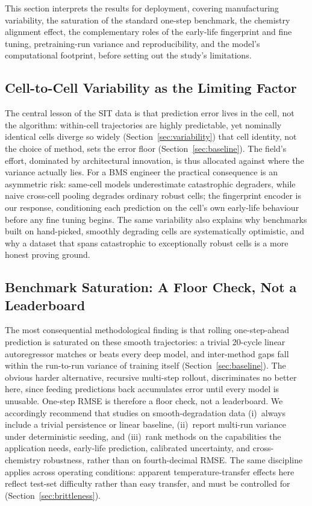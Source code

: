 This section interprets the results for deployment, covering manufacturing
variability, the saturation of the standard one-step benchmark, the chemistry
alignment effect, the complementary roles of the early-life fingerprint and
fine tuning, pretraining-run variance and reproducibility, and the model's
computational footprint, before setting out the study's limitations.

\subsection{Cell-to-Cell Variability as the Limiting Factor}

The central lesson of the SIT data is that prediction error lives in the cell,
not the algorithm: within-cell trajectories are highly predictable, yet
nominally identical cells diverge so widely (Section~\ref{sec:variability}) that
cell identity, not the choice of method, sets the error floor
(Section~\ref{sec:baseline}). The field's effort, dominated by architectural
innovation, is thus allocated against where the variance actually lies. For a
BMS engineer the practical consequence is an asymmetric risk: same-cell models
underestimate catastrophic degraders, while naive cross-cell pooling degrades
ordinary robust cells; the fingerprint encoder is our response, conditioning
each prediction on the cell's own early-life behaviour before any fine tuning
begins. The same variability also explains why benchmarks built on hand-picked,
smoothly degrading cells are systematically optimistic, and why a dataset that
spans catastrophic to exceptionally robust cells is a more honest proving
ground.

\subsection{Benchmark Saturation: A Floor Check, Not a Leaderboard}

The most consequential methodological finding is that rolling one-step-ahead
prediction is saturated on these smooth trajectories: a trivial 20-cycle linear
autoregressor matches or beats every deep model, and inter-method gaps fall
within the run-to-run variance of training itself (Section~\ref{sec:baseline}).
The obvious harder alternative, recursive multi-step rollout, discriminates no
better here, since feeding predictions back accumulates error until every model
is unusable. One-step RMSE is therefore a floor check, not a leaderboard. We
accordingly recommend that studies on smooth-degradation data (i)~always include
a trivial persistence or linear baseline, (ii)~report multi-run variance under
deterministic seeding, and (iii)~rank methods on the capabilities the
application needs, early-life prediction, calibrated uncertainty, and
cross-chemistry robustness, rather than on fourth-decimal RMSE. The same
discipline applies across operating conditions: apparent temperature-transfer
effects here reflect test-set difficulty rather than easy transfer, and must be
controlled for (Section~\ref{sec:brittleness}).

